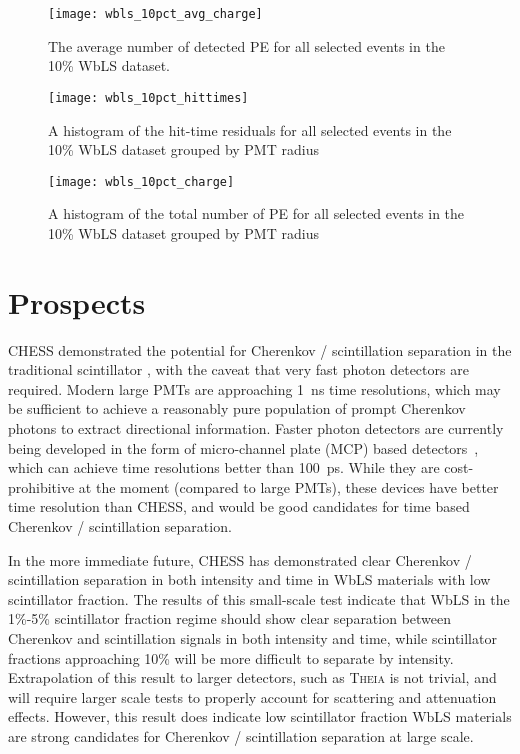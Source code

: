 \begin{figure}
\centering
\texttt{[image: wbls\_10pct\_avg\_charge]}
\caption{\label{fig:wbls10pct_avg_charge}The average number of detected PE for all selected events in the 10\% WbLS dataset.}
\end{figure}

\begin{figure}
\centering
\texttt{[image: wbls\_10pct\_hittimes]}
\caption{\label{fig:wbls10pct_tresid}A histogram of the hit-time residuals for all selected events in the 10\% WbLS dataset grouped by PMT radius}
\end{figure}

\begin{figure}
\centering
\texttt{[image: wbls\_10pct\_charge]}
\caption{\label{fig:wbls10pct_totalq}A histogram of the total number of PE for all selected events in the 10\% WbLS dataset grouped by PMT radius}
\end{figure}

\section{Prospects}

CHESS demonstrated the potential for Cherenkov / scintillation separation in the traditional scintillator {\labppo}, with the caveat that very fast photon detectors are required.
Modern large PMTs are approaching 1~ns time resolutions, which may be sufficient to achieve a reasonably pure population of prompt Cherenkov photons to extract directional information.
Faster photon detectors are currently being developed in the form of micro-channel plate (MCP) based detectors~\cite{lappd,lappd2}, which can achieve time resolutions better than 100~ps.
While they are cost-prohibitive at the moment (compared to large PMTs), these devices have better time resolution than CHESS, and would be good candidates for time based Cherenkov / scintillation separation.

In the more immediate future, CHESS has demonstrated clear Cherenkov / scintillation separation in both intensity and time in WbLS materials with low scintillator fraction. 
The results of this small-scale test indicate that WbLS in the 1\%-5\% scintillator fraction regime should show clear separation between Cherenkov and scintillation signals in both intensity and time, while scintillator fractions approaching 10\% will be more difficult to separate by intensity.
Extrapolation of this result to larger detectors, such as \textsc{Theia} is not trivial, and will require larger scale tests to properly account for scattering and attenuation effects.
However, this result does indicate low scintillator fraction WbLS materials are strong candidates for Cherenkov / scintillation separation at large scale.

